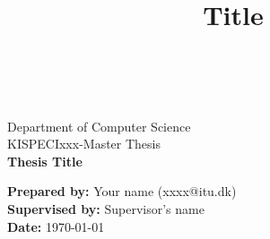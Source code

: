 \documentclass[12pt]{article}
\title{Title}
\makeatletter
\def \LOGOPATH {Figures/ITU.svg}
\def \DEPARTEMENT {Department of Computer Science}
\def \COURSENUM {KISPECIxxx}
\def \COURSENAME {Master Thesis}
\def \REPORTTITLE {Thesis Title}
\def \STUDENTNAME {Your name (xxxx@itu.dk)}
\def \INSTRUCTOR {Supervisor's name}
\makeatother
\begin{document}

\begin{titlepage}
    \vfill
    \begin{center}
         \\
        \hfill \\
        \Large{\DEPARTEMENT} \\
        \Large{\COURSENUM\;-\;\COURSENAME} \\
        \vfill
        \textbf{\LARGE{\REPORTTITLE}}
    \end{center}
    \vfill
    \begin{flushleft}
        \Large{\textbf{Prepared by:} \STUDENTNAME} \\
        \Large{\textbf{Supervised by:} \INSTRUCTOR} \\
        \Large{\textbf{Date:} \today}
    \end{flushleft}
    \vfill
\end{titlepage}







\newpage

\tableofcontents

\newpage









\label{EndOfText}

\newpage
{}


\label{endOfDoc}






\end{document}
